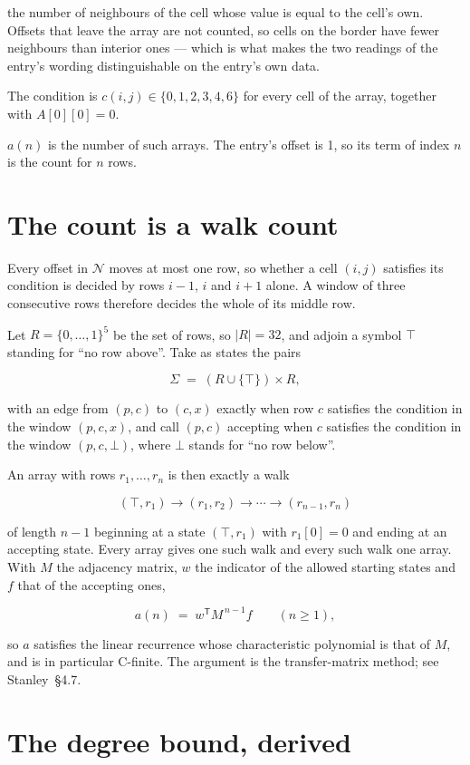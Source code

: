 \documentclass[11pt]{article}
\theoremstyle{definition}
\begin{document}
the number of neighbours of the cell whose value is equal to the cell's own. Offsets that leave the array are not counted, so cells on the border have fewer neighbours than interior ones --- which is what makes the two readings of the entry's wording distinguishable on the entry's own data.

The condition is $c(i,j) \in \{0, 1, 2, 3, 4, 6\}$ for every cell of the array, together with $A[0][0]=0$.

$a(n)$ is the number of such arrays. The entry's offset is 1, so its term of index $n$ is the count for $n$ rows.

\section{The count is a walk count}

Every offset in $\mathcal{N}$ moves at most one row, so whether a cell $(i,j)$ satisfies its condition is decided by rows $i-1$, $i$ and $i+1$ alone. A window of three consecutive rows therefore decides the whole of its middle row.

Let $R = \{0,\dots,1\}^{5}$ be the set of rows, so $|R| = 32$, and adjoin a symbol $\top$ standing for ``no row above''. Take as states the pairs

\[\Sigma \;=\; (R \cup \{\top\}) \times R,\]

with an edge from $(p,c)$ to $(c,x)$ exactly when row $c$ satisfies the condition in the window $(p,c,x)$, and call $(p,c)$ accepting when $c$ satisfies the condition in the window $(p,c,\bot)$, where $\bot$ stands for ``no row below''.

An array with rows $r_1,\dots,r_n$ is then exactly a walk

\[(\top,r_1) \to (r_1,r_2) \to \cdots \to (r_{n-1},r_n)\]

of length $n-1$ beginning at a state $(\top,r_1)$ with $r_1[0]=0$ and ending at an accepting state. Every array gives one such walk and every such walk one array. With $M$ the adjacency matrix, $w$ the indicator of the allowed starting states and $f$ that of the accepting ones,

\[a(n) \;=\; w^{\mathsf T} M^{\,n-1} f \qquad (n \ge 1),\]

so $a$ satisfies the linear recurrence whose characteristic polynomial is that of $M$, and is in particular C-finite. The argument is the transfer-matrix method; see Stanley~\S4.7.

\section{The degree bound, derived}
\end{document}

